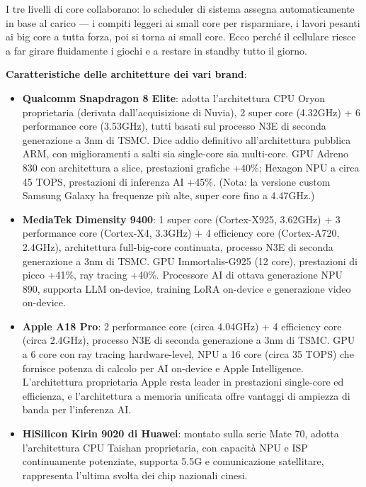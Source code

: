 I tre livelli di core collaborano: lo scheduler di sistema assegna automaticamente in base al carico — i compiti leggeri ai small core per risparmiare, i lavori pesanti ai big core a tutta forza, poi si torna ai small core. Ecco perché il cellulare riesce a far girare fluidamente i giochi e a restare in standby tutto il giorno.

\textbf{Caratteristiche delle architetture dei vari brand}:

\begin{itemize}
  \item \textbf{Qualcomm Snapdragon 8 Elite}: adotta l'architettura CPU Oryon proprietaria (derivata dall'acquisizione di Nuvia), 2 super core (4.32GHz) + 6 performance core (3.53GHz), tutti basati sul processo N3E di seconda generazione a 3nm di TSMC. Dice addio definitivo all'architettura pubblica ARM, con miglioramenti a salti sia single-core sia multi-core. GPU Adreno 830 con architettura a slice, prestazioni grafiche +40\%; Hexagon NPU a circa 45 TOPS, prestazioni di inferenza AI +45\%. (Nota: la versione custom Samsung Galaxy ha frequenze più alte, super core fino a 4.47GHz.)
  \item \textbf{MediaTek Dimensity 9400}: 1 super core (Cortex-X925, 3.62GHz) + 3 performance core (Cortex-X4, 3.3GHz) + 4 efficiency core (Cortex-A720, 2.4GHz), architettura full-big-core continuata, processo N3E di seconda generazione a 3nm di TSMC. GPU Immortalis-G925 (12 core), prestazioni di picco +41\%, ray tracing +40\%. Processore AI di ottava generazione NPU 890, supporta LLM on-device, training LoRA on-device e generazione video on-device.
  \item \textbf{Apple A18 Pro}: 2 performance core (circa 4.04GHz) + 4 efficiency core (circa 2.4GHz), processo N3E di seconda generazione a 3nm di TSMC. GPU a 6 core con ray tracing hardware-level, NPU a 16 core (circa 35 TOPS) che fornisce potenza di calcolo per AI on-device e Apple Intelligence. L'architettura proprietaria Apple resta leader in prestazioni single-core ed efficienza, e l'architettura a memoria unificata offre vantaggi di ampiezza di banda per l'inferenza AI.
  \item \textbf{HiSilicon Kirin 9020 di Huawei}: montato sulla serie Mate 70, adotta l'architettura CPU Taishan proprietaria, con capacità NPU e ISP continuamente potenziate, supporta 5.5G e comunicazione satellitare, rappresenta l'ultima svolta dei chip nazionali cinesi.
\end{itemize}


